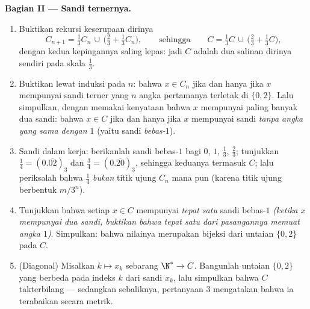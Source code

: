 \begin{problem}[{Soal akhir pekan --- \omterm{pb:b1:topology:1}{himpunan Cantor} sepertiga
tengah: panjang nol, takterbilang, sempurna, dan $C + C =
\intcc{0}{2}$}]
\medskip
\noindent\textbf{Bagian II --- Sandi ternernya.}
\begin{enumerate}[resume]
  \item Buktikan rekursi keserupaan dirinya
        \[
        C_{n+1} = \tfrac13 C_n \,\cup\,
        \bigl(\tfrac23 + \tfrac13 C_n\bigr),
        \qquad\text{sehingga}\qquad
        C = \tfrac13 C \,\cup\, \bigl(\tfrac23 + \tfrac13
        C\bigr),
        \]
        dengan kedua kepingannya saling lepas: jadi $C$ adalah dua salinan
        dirinya sendiri pada skala $\frac13$.
  \item Buktikan lewat induksi pada $n$: bahwa $x \in C_n$ jika dan hanya jika
        $x$ mempunyai sandi terner yang $n$ angka pertamanya terletak di
        $\{0, 2\}$. Lalu simpulkan, dengan memakai kenyataan bahwa $x$ mempunyai paling banyak
        dua sandi: bahwa $x \in C$ jika dan hanya jika $x$ mempunyai sandi
        \emph{tanpa angka yang sama dengan $1$} (yaitu sandi \emph{bebas-$1$}).
  \item Sandi dalam kerja: berikanlah sandi bebas-$1$ bagi $0$, $1$,
        $\frac13$, $\frac23$; tunjukkan $\frac14 = (0.\overline{02})_3$
        dan $\frac34 = (0.\overline{20})_3$, sehingga keduanya termasuk
        $C$; lalu periksalah bahwa $\frac14$ \emph{bukan} titik ujung
        $C_n$ mana pun (karena titik ujung berbentuk $m/3^n$).
  \item Tunjukkan bahwa setiap $x \in C$ mempunyai \emph{tepat satu} sandi
        bebas-$1$ \emph{(ketika $x$ mempunyai dua sandi, buktikan bahwa tepat
        satu dari pasangannya memuat angka $1$)}. Simpulkan: bahwa
         nilainya merupakan bijeksi dari untaian $\{0,2\}$ pada
        $C$.
  \item (Diagonal) Misalkan $k \mapsto x_k$ sebarang  $\N^* \to C$.
        Bangunlah untaian $\{0, 2\}$ yang berbeda pada indeks $k$ dari
        sandi $x_k$, lalu simpulkan bahwa $C$ takterbilang
        --- sedangkan sebaliknya, pertanyaan 3 mengatakan bahwa ia
        terabaikan secara metrik.
\end{enumerate}


\end{problem}
